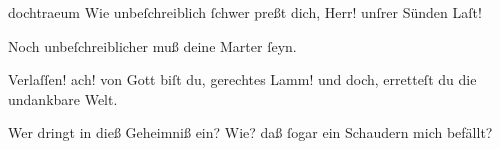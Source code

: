\documentclass{ees}
\begin{document}
{\begin{movement}{dochtraeum}
    \voice[Lazarus]
    Wie unbeſchreiblich ſchwer preßt dich, Herr! unſrer Sünden Laſt!

    \voice[Eidli]
    Noch unbeſchreiblicher muß deine Marter ſeyn.

    Verlaſſen! ach! von Gott biſt du, gerechtes Lamm!
    und doch, erretteſt du die undankbare Welt.

    Wer dringt in dieß Geheimniß ein?
    Wie? daß ſogar ein Schaudern mich befällt?
  \end{movement}



}

\eesScore
\end{document}
